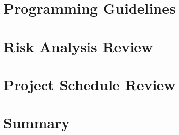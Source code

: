\documentclass[11pt,a4paper]{article}
\begin{document}
\section{Programming Guidelines}

\section{Risk Analysis Review}

\section{Project Schedule Review}

\section{Summary}

\newpage


\end{document}
